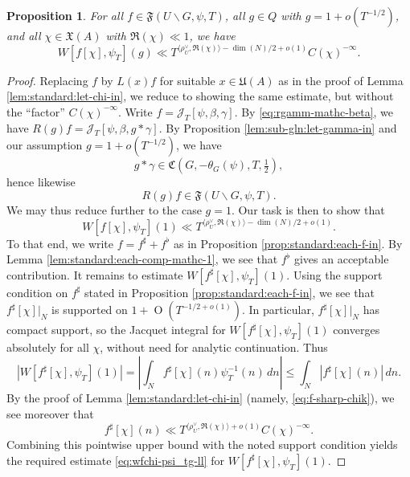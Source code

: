\documentclass[reqno]{amsart}
\def\O{\operatorname{O}}
\theoremstyle{plain} \newtheorem{theorem} {Theorem}
\newtheorem{proposition} [theorem] {Proposition}
\theoremstyle{definition} \newtheorem{definition} [theorem] {Definition}
\theoremstyle{itplain} %
\numberwithin{equation}{section}
\numberwithin{theorem}{section}
\renewcommand{\leq}{\leqslant}
\begin{document}
\begin{proposition}\label{lem:all-f-in}
For all $f \in \mathfrak{F}(U \backslash G, \psi, T)$, all $g \in Q$ with $g = 1 + o(T^{-1/2})$, and all $\chi \in \mathfrak{X}(A)$ with $\Re(\chi) \ll 1$, we have
\begin{equation}\label{eq:wfchi-psi_tg-ll}
  W[f[\chi], \psi_T](g)
  \ll T^{\langle \rho_U^\vee, \Re(\chi) \rangle - \dim(N)/2 + o(1)} C(\chi)^{-\infty}.
\end{equation}
\end{proposition}
\begin{proof}
  Replacing $f$ by $L(x) f$ for suitable $x \in \mathfrak{U}(A)$ as in the proof of Lemma \ref{lem:standard:let-chi-in}, we reduce to showing the same estimate, but without the ``factor'' $C(\chi)^{-\infty}$.  Write $f = \mathcal{J}_T[\psi, \beta, \gamma]$.  By \eqref{eq:rgamm-mathc-beta}, we have $R(g) f = \mathcal{J}_T[\psi,\beta, g \ast \gamma]$.  By Proposition \ref{lem:sub-gln:let-gamma-in} and our assumption $g = 1 + o(T^{-1/2})$, we have
  \begin{equation*}
    g \ast \gamma \in \mathfrak{C}(G,-\theta_G(\psi),T,\tfrac{1}{2}),
\end{equation*}
hence likewise
\begin{equation*}
R(g) f \in \mathfrak{F}(U \backslash G, \psi, T).
\end{equation*}
We may thus reduce further to the case $g = 1$.  Our task is then to show that
\begin{equation*}
  W[f[\chi], \psi_T](1)
  \ll T^{\langle \rho_U^\vee, \Re(\chi) \rangle - \dim(N)/2 + o(1)}.
\end{equation*}
To that end, we write $f = f ^\sharp + f ^\flat$ as in Proposition \ref{prop:standard:each-f-in}.  By Lemma \ref{lem:standard:each-comp-mathc-1}, we see that $f ^\flat$ gives an acceptable contribution.  It remains to estimate $W [f ^\sharp [\chi ], \psi _T ] (1)$.  Using the support condition on $f ^\sharp$ stated in Proposition \ref{prop:standard:each-f-in}, we see that $f ^\sharp [\chi ]|_{N}$ is supported on $1 + \O(T^{-1/2+o(1)})$.  
In particular, $f ^\sharp [\chi ]|_{N}$ has compact support, so the Jacquet integral for $W [f ^\sharp [\chi ], \psi _T ] (1)$ converges absolutely for all $\chi$, without need for analytic continuation.  Thus
\begin{equation*}
    |W[f ^\sharp [\chi],\psi_T](1)|
    =
    \left\lvert
      \int_N f ^\sharp [\chi](n) \psi_T^{-1}(n) \, d n
    \right\rvert
    \leq
    \int _{N} |f ^\sharp [\chi](n)| \, d n.
  \end{equation*}
  By the proof of Lemma \ref{lem:standard:let-chi-in} (namely, \eqref{eq:f-sharp-chik}), we see moreover that
  \begin{equation*}
    f ^\sharp [\chi](n) \ll  T^{\langle \rho_U^\vee , \Re(\chi) \rangle + o(1)} C(\chi)^{-\infty}.
  \end{equation*}
  Combining this pointwise upper bound with the noted support condition yields the required estimate \eqref{eq:wfchi-psi_tg-ll} for $W[f ^\sharp [\chi],\psi_T](1)$.
\end{proof}
\end{document}
